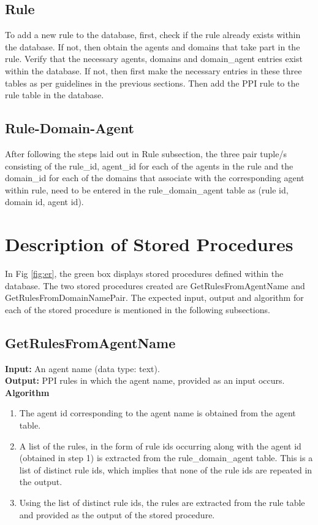 \documentclass[msc,deptreport,ai]{infthesis}      %
\begin{document}
\subsection{Rule}
	To add a new rule to the database, first, check if the rule already exists within the database. If not, then obtain the agents and domains that take part in the rule. Verify that the necessary agents, domains and domain\_agent entries exist within the database. If not, then first make the necessary entries in these three tables as per guidelines in the previous sections. Then add the PPI rule to the rule table in the database. 
	\subsection{Rule-Domain-Agent}
	After following the steps laid out in Rule subsection, the three pair tuple/s consisting of the rule\_id, agent\_id for each of the agents in the rule and the domain\_id for each of the domains that associate with the corresponding agent within rule, need to be entered in the rule\_domain\_agent table as (rule id, domain id, agent id).
\section{Description of Stored Procedures}
 In Fig \ref{fig:er}, the green box displays stored procedures defined within the database. The two stored procedures created are GetRulesFromAgentName and GetRulesFromDomainNamePair. The expected input, output and algorithm for each of the stored procedure is mentioned in the following subsections.
 \subsection{GetRulesFromAgentName}
 \textbf{Input:} An agent name (data type: text).\\
 \textbf{Output:} PPI rules in which the agent name, provided as an input occurs.\\ 
 \textbf{Algorithm} 
 \begin{enumerate}
 	\item The agent id corresponding to the agent name is obtained from the agent table. 
 	\item A list of the rules, in the form of rule ids occurring along with the agent id (obtained in step 1) is extracted from the rule\_domain\_agent table. This is a list of distinct rule ids, which implies that none of the rule ids are repeated in the output.
 	\item Using the list of distinct rule ids, the rules are extracted from the rule table and provided as the output of the stored procedure.
 \end{enumerate}
\end{document}
